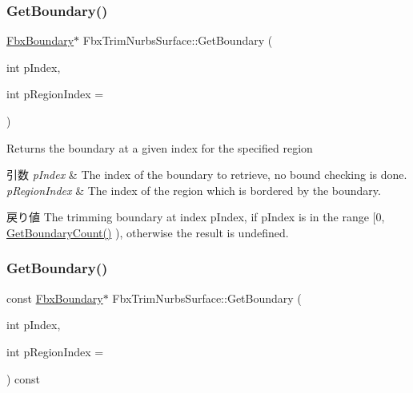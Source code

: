 \subsubsection{\texorpdfstring{Get\+Boundary()}{GetBoundary()}\hspace{0.1cm}{\footnotesize\ttfamily [1/2]}}
{\footnotesize\ttfamily \hyperlink{class_fbx_boundary}{Fbx\+Boundary}$\ast$ Fbx\+Trim\+Nurbs\+Surface\+::\+Get\+Boundary (\begin{DoxyParamCaption}\item[{int}]{p\+Index,  }\item[{int}]{p\+Region\+Index = {} }\end{DoxyParamCaption})}

Returns the boundary at a given index for the specified region 
\begin{DoxyParams}{引数}
{\em p\+Index} & The index of the boundary to retrieve, no bound checking is done. \\
\hline
{\em p\+Region\+Index} & The index of the region which is bordered by the boundary. \\
\hline
\end{DoxyParams}
\begin{DoxyReturn}{戻り値}
The trimming boundary at index p\+Index, if p\+Index is in the range \mbox{[}0, \hyperlink{class_fbx_trim_nurbs_surface_a95faf8ef0f87e4a329a7a7c0340dbd99}{Get\+Boundary\+Count()} ), otherwise the result is undefined. 
\end{DoxyReturn}
\mbox{\label{class_fbx_trim_nurbs_surface_a64eb1c82eb77f8e48a7da4ecea7c1f81}} 
\subsubsection{\texorpdfstring{Get\+Boundary()}{GetBoundary()}\hspace{0.1cm}{\footnotesize\ttfamily [2/2]}}
{\footnotesize\ttfamily const \hyperlink{class_fbx_boundary}{Fbx\+Boundary}$\ast$ Fbx\+Trim\+Nurbs\+Surface\+::\+Get\+Boundary (\begin{DoxyParamCaption}\item[{int}]{p\+Index,  }\item[{int}]{p\+Region\+Index = {} }\end{DoxyParamCaption}) const}

